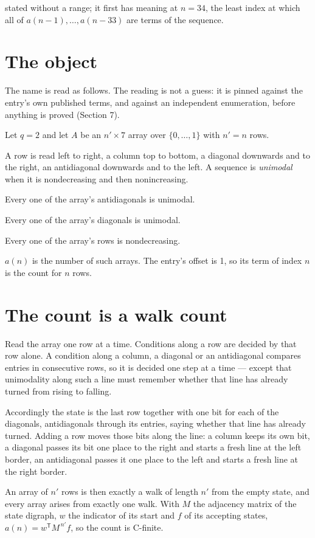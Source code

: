 \documentclass[11pt]{article}
\theoremstyle{definition}
\begin{document}
stated without a range; it first has meaning at $n = 34$, the least index at which all of $a(n-1),\dots,a(n-33)$ are terms of the sequence.

\section{The object}

The name is read as follows. The reading is not a guess: it is pinned against the entry's own published terms, and against an independent enumeration, before anything is proved (Section 7).

Let $q = 2$ and let $A$ be an $n' \times 7$ array over $\{0,\dots,1\}$ with $n' = n$ rows.

A row is read left to right, a column top to bottom, a diagonal downwards and to the right, an antidiagonal downwards and to the left. A sequence is {\itshape unimodal} when it is nondecreasing and then nonincreasing.

Every one of the array's antidiagonals is unimodal.

Every one of the array's diagonals is unimodal.

Every one of the array's rows is nondecreasing.

$a(n)$ is the number of such arrays. The entry's offset is 1, so its term of index $n$ is the count for $n$ rows.

\section{The count is a walk count}

Read the array one row at a time. Conditions along a row are decided by that row alone. A condition along a column, a diagonal or an antidiagonal compares entries in consecutive rows, so it is decided one step at a time --- except that unimodality along such a line must remember whether that line has already turned from rising to falling.

Accordingly the state is the last row together with one bit for each of the diagonals, antidiagonals through its entries, saying whether that line has already turned. Adding a row moves those bits along the line: a column keeps its own bit, a diagonal passes its bit one place to the right and starts a fresh line at the left border, an antidiagonal passes it one place to the left and starts a fresh line at the right border.

An array of $n'$ rows is then exactly a walk of length $n'$ from the empty state, and every array arises from exactly one walk. With $M$ the adjacency matrix of the state digraph, $w$ the indicator of its start and $f$ of its accepting states, $a(n) = w^{\mathsf T}M^{\,n'}f$, so the count is C-finite.
\end{document}
